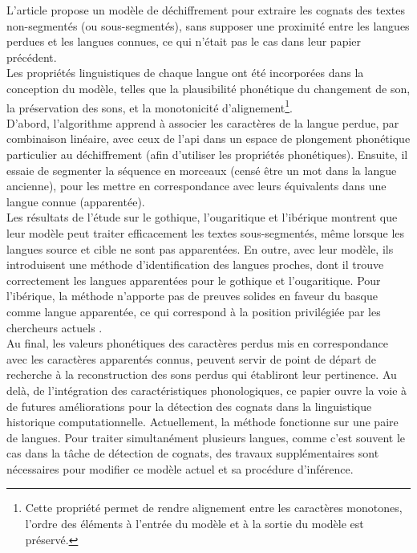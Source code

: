 \documentclass[12pt, twoside]{report}
\begin{document}
L'article propose un modèle de déchiffrement pour extraire les \glspl{cognat} des textes non-segmentés (ou sous-segmentés), sans supposer une proximité entre les langues perdues et les langues connues, ce qui n'était pas le cas dans leur papier précédent\autocite{ugaritic-and-linear-B}.\\
\indent Les propriétés linguistiques de chaque langue ont été incorporées dans la conception du modèle, telles que la plausibilité phonétique du changement de son, la préservation des sons, et la monotonicité d'alignement\footnote{Cette propriété permet de rendre alignement entre les caractères monotones, l'ordre des éléments à l'entrée du modèle et à la sortie du modèle est préservé.}.\\
\indent D'abord, l'algorithme apprend à associer les caractères de la langue perdue, par combinaison linéaire, avec ceux de l'\gls{api} dans un espace de plongement phonétique particulier au déchiffrement (afin d'utiliser les propriétés phonétiques). Ensuite, il essaie de segmenter la séquence en morceaux (censé être un mot dans la langue ancienne), pour les mettre en correspondance avec leurs équivalents dans une langue connue (apparentée).\\
\indent Les résultats de l'étude sur le gothique, l'ougaritique et l'ibérique montrent que leur modèle peut traiter efficacement les textes sous-segmentés, même lorsque les langues source et cible ne sont pas apparentées. En outre, avec leur modèle, ils introduisent une méthode d'identification des langues proches, dont il trouve correctement les langues apparentées pour le gothique et l'ougaritique. Pour l'ibérique, la méthode n'apporte pas de preuves solides en faveur du basque comme langue apparentée, ce qui correspond à la position privilégiée par les chercheurs actuels \autocite{deepmind2022}.\\
\indent Au final, les valeurs phonétiques des caractères perdus mis en correspondance avec les caractères apparentés connus, peuvent servir de point de départ de recherche à la reconstruction des sons perdus qui établiront leur pertinence. Au delà, de l'intégration des caractéristiques phonologiques, ce papier ouvre la voie à de futures améliorations pour la détection des \glspl{cognat} dans la linguistique historique computationnelle. Actuellement, la méthode fonctionne sur une paire de langues. Pour traiter simultanément plusieurs langues, comme c'est souvent le cas dans la tâche de détection de \glspl{cognat}, des travaux supplémentaires sont nécessaires pour modifier ce modèle actuel et sa procédure d'inférence.\\
\end{document}
